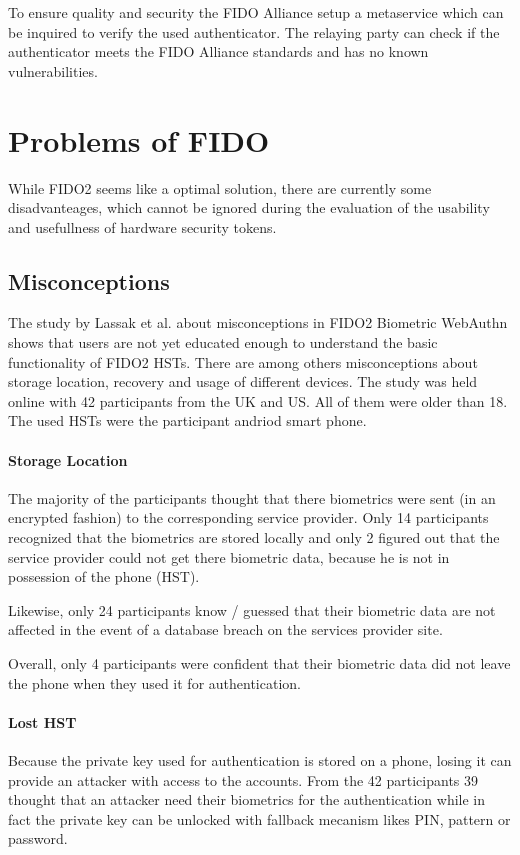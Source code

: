 \documentclass[runningheads]{llncs}
\begin{document}
To ensure quality and security the FIDO Alliance setup a metaservice which can be inquired to verify the used authenticator. The relaying party can check if the authenticator meets the FIDO Alliance standards and has no known vulnerabilities.\cite{9099190}

\section{Problems of FIDO}
While FIDO2 seems like a optimal solution, there are currently some disadvanteages, which cannot be ignored during the evaluation of the usability and usefullness of hardware security tokens.

\subsection{Misconceptions}
The study by Lassak et al.\cite{274547} about misconceptions in FIDO2 Biometric WebAuthn shows that users are not yet educated enough to understand the basic functionality of FIDO2 HSTs. There are among others misconceptions about storage location, recovery and usage of different devices. The study was held online with 42 participants from the UK and US. All of them were older than 18. The used HSTs were the participant andriod smart phone.

\paragraph{Storage Location}
The majority of the participants thought that there biometrics were sent (in an encrypted fashion) to the corresponding service provider. Only 14 participants recognized that the biometrics are stored locally and only 2 figured out that the service provider could not get there biometric data, because he is not in possession of the phone (HST).

Likewise, only 24 participants know / guessed that their biometric data are not affected in the event of a database breach on the services provider site.

Overall, only 4 participants were confident that their biometric data did not leave the phone when they used it for authentication.

\paragraph{Lost HST}
Because the private key used for authentication is stored on a phone, losing it can provide an attacker with access to the accounts. From the 42 participants 39 thought that an attacker need their biometrics for the authentication while in fact the private key can be unlocked with fallback mecanism likes PIN, pattern or password.
\end{document}
